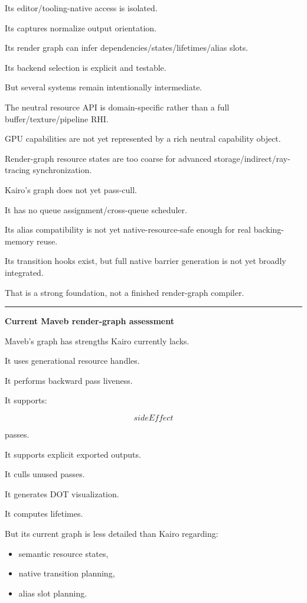 Its editor/tooling-native access is isolated.

Its captures normalize output orientation.

Its render graph can infer dependencies/states/lifetimes/alias slots.

Its backend selection is explicit and testable.

But several systems remain intentionally intermediate.

The neutral resource API is domain-specific rather than a full buffer/texture/pipeline RHI.

GPU capabilities are not yet represented by a rich neutral capability object.

Render-graph resource states are too coarse for advanced storage/indirect/ray-tracing synchronization.

Kairo's graph does not yet pass-cull.

It has no queue assignment/cross-queue scheduler.

Its alias compatibility is not yet native-resource-safe enough for real backing-memory reuse.

Its transition hooks exist, but full native barrier generation is not yet broadly integrated.

That is a strong foundation, not a finished render-graph compiler.

\begin{center}\rule{0.5\linewidth}{0.5pt}\end{center}

\textbf{Current Maveb render-graph assessment}

Maveb's graph has strengths Kairo currently lacks.

It uses generational resource handles.

It performs backward pass liveness.

It supports:

\[
sideEffect
\]

passes.

It supports explicit exported outputs.

It culls unused passes.

It generates DOT visualization.

It computes lifetimes.

But its current graph is less detailed than Kairo regarding:

\begin{itemize}
\tightlist
\item
  semantic resource states,
\item
  native transition planning,
\item
  alias slot planning.
\end{itemize}

